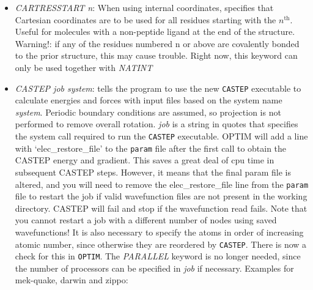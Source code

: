 \documentclass[12pt,a4paper,dvips]{article}
\begin{document}
\begin{itemize}
\item {\it CARTRESSTART n}: When using internal coordinates, specifies that
  Cartesian coordinates are to be used for all
  residues starting with the $n^{\mbox{th}}$. Useful for molecules with a
  non-peptide ligand at the end of the structure. Warning!: if any of the
  residues numbered n or above are covalently bonded to the prior structure,
  this may cause trouble. Right now, this keyword can only be used together
  with {\it NATINT\/}

\item {\it CASTEP job system\/}: tells the program to use the new {\tt CASTEP} 
executable to calculate energies and
forces with input files based on the system name {\it system\/}. Periodic boundary 
conditions are assumed, so projection is not performed to remove overall rotation.
{\it job} is a string in quotes that specifies the system call required to run 
the {\tt CASTEP} executable. 
OPTIM will add a line with `elec\_restore\_file' to the {\tt param} file after the
first call to obtain the CASTEP energy and gradient.
This saves a great deal of cpu time in subsequent CASTEP steps.
However, it means that the final param file is altered, and you will need
to remove the elec\_restore\_file line from the {\tt param} file to restart
the job if valid wavefunction files are not present in the working directory.
CASTEP will fail and stop if the wavefunction read fails.
Note that you cannot restart a job with a different number of nodes using
saved wavefunctions!
It is also necessary to specify the atoms in order of increasing atomic number,
since otherwise they are reordered by {\tt CASTEP}.
There is now a check for this in {\tt OPTIM}.
The {\it PARALLEL} keyword is no longer needed, since
the number of processors can be specified in {\it job} if necessary. Examples for mek-quake, darwin and zippo:


\end{itemize}
\end{document}
